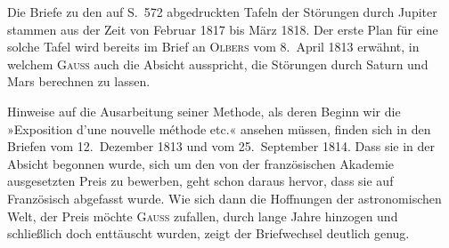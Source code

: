 \par\noindent\hspace*{\parindent}Die Briefe zu den auf S.~572 abgedruckten Tafeln der Störungen durch Jupiter stammen aus der Zeit von
Februar 1817 bis März 1818. Der erste Plan für eine solche Tafel wird bereits im Brief an \textsc{Olbers} vom
8.~April 1813 erwähnt, in welchem \textsc{Gauss} auch die Absicht ausspricht, die Störungen durch Saturn und
Mars berechnen zu lassen.

\par\noindent\hspace*{\parindent}Hinweise auf die Ausarbeitung seiner Methode, als deren Beginn wir die »Exposition d’une nouvelle méthode
etc.« ansehen müssen, finden sich in den Briefen vom 12.~Dezember 1813 und vom 25.~September
1814. Dass sie in der Absicht begonnen wurde, sich um den von der französischen Akademie ausgesetzten
Preis zu bewerben, geht schon daraus hervor, dass sie auf Französisch abgefasst wurde. Wie sich
dann die Hoffnungen der astronomischen Welt, der Preis möchte \textsc{Gauss} zufallen, durch lange Jahre hinzogen
und schließlich doch enttäuscht wurden, zeigt der Briefwechsel deutlich genug.
\endgroup
\endgroup
